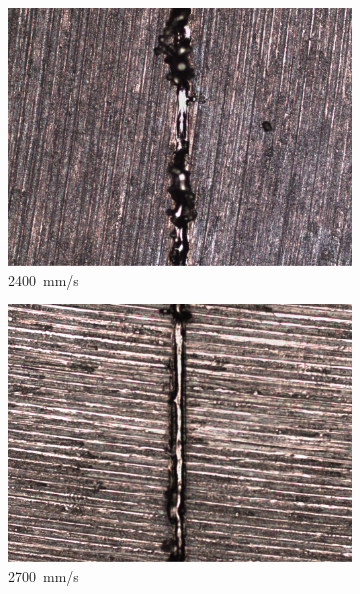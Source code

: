 \documentclass{article}
\begin{document}
\begin{figure}
\begin{subfigure}[b]{0.24\textwidth}
        \includegraphics[width=\textwidth]{experiment/photos/90W_V2400}
        \caption{\SI{2400}{mm/s}}
    \end{subfigure}\:
    \begin{subfigure}[b]{0.24\textwidth}
        \includegraphics[width=\textwidth]{experiment/photos/90W_V2700}
        \caption{\SI{2700}{mm/s}}
    \end{subfigure}\:
    \begin{subfigure}[b]{0.24\textwidth}

\end{subfigure}
\end{figure}
\end{document}

